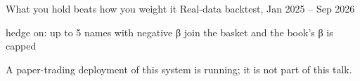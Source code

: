 \begin{frame}{What you hold beats how you weight it}
  \begingroup\small\color{vnslidebody} Real-data backtest, Jan 2025 – Sep 2026\par\endgroup
  \vspace{4pt}
  \par
  \vspace{3pt}
  \vndotlegend\par
  {\scriptsize hedge on: up to 5 names with negative β join the basket and the book's β is capped\par}
  \vfill
  {\scriptsize A paper-trading deployment of this system is running; it is not part of this talk.\par}
\end{frame}
